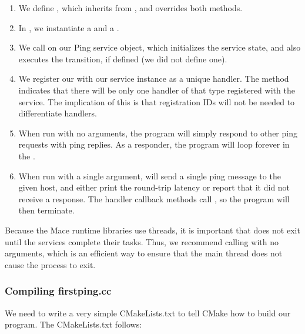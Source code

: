 \begin{enumerate}

\item We define , which inherits from
  , and overrides both methods.

\item In , we instantiate a
   and a .

\item We call  on our Ping service object, which
  initializes the service state, and also executes the
   transition, if defined (we did not define one).

\item We register our  with our service
  instance as a unique handler.  The 
  method indicates that there will be only one handler of that type
  registered with the service.  The implication of this is that
  registration IDs will not be needed to differentiate handlers.

\item When run with no arguments, the program will simply respond to
  other ping requests with ping replies.  As a responder, the program
  will loop forever in the .

\item When run with a single argument,  will send a
  single ping message to the given host, and either print the
  round-trip latency or report that it did not receive a response.
  The handler callback methods call , so the program
  will then terminate.

\end{enumerate}

Because the Mace runtime libraries use threads, it is important that
 does not exit until the services complete their
tasks.  Thus, we recommend calling  with
no arguments, which is an efficient way to ensure that the main thread
does not cause the process to exit.

\subsubsection{Compiling firstping.cc}
\label{sec:compiling-ping-cc}

We need to write a very simple CMakeLists.txt to tell CMake how to build
our program.  The CMakeLists.txt
 follows:

